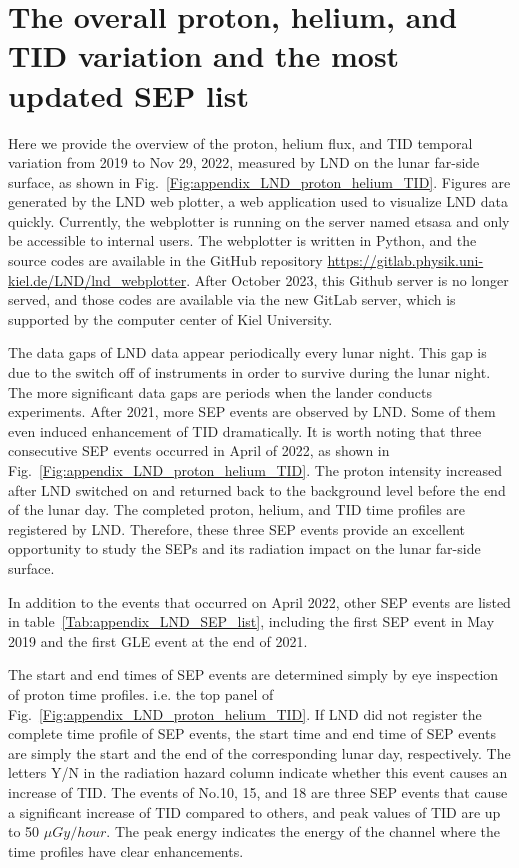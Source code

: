 \section*{The overall proton, helium, and TID variation and the most updated SEP list}


Here we provide the overview of the proton, helium flux, and \ac{TID} temporal variation from 2019 to Nov 29, 2022, measured by \ac{LND} on the lunar far-side surface, as shown in Fig.~\ref{Fig:appendix_LND_proton_helium_TID}.
Figures are generated by the \ac{LND} web plotter, a web application used to visualize \ac{LND} data quickly. 
Currently, the webplotter is running on the server named etsasa and only be accessible to internal users.
The webplotter is written in Python, and the source codes are available in the GitHub repository \url{https://gitlab.physik.uni-kiel.de/LND/lnd_webplotter}. After October 2023, this Github server is no longer served, and those codes are available via the new GitLab server, which is supported by the computer center of Kiel University.

The data gaps of \ac{LND} data appear periodically every lunar night. This gap is due to the switch off of instruments in order to survive during the lunar night. The more significant data gaps are periods when the lander conducts experiments. After 2021, more \ac{SEP} events are observed by \ac{LND}. Some of them even induced enhancement of \ac{TID} dramatically. 
It is worth noting that three consecutive \ac{SEP} events occurred in April of 2022, as shown in Fig.~\ref{Fig:appendix_LND_proton_helium_TID}. The proton intensity increased after \ac{LND} switched on and returned back to the background level before the end of the lunar day. The completed proton, helium, and \ac{TID} time profiles are registered by \ac{LND}. Therefore, these three \ac{SEP} events provide an excellent opportunity to study the \acp{SEP} and its radiation impact on the lunar far-side surface.

In addition to the events that occurred on April 2022, other \ac{SEP} events are listed in table~\ref{Tab:appendix_LND_SEP_list}, including the first \ac{SEP} event in May 2019 and the first \ac{GLE} event at the end of 2021.

The start and end times of \ac{SEP} events are determined simply by eye inspection of proton time profiles. i.e. the top panel of Fig.~\ref{Fig:appendix_LND_proton_helium_TID}. If \ac{LND} did not register the complete time profile of \ac{SEP} events, the start time and end time of \ac{SEP} events are simply the start and the end of the corresponding lunar day, respectively.
The letters Y/N in the radiation hazard column indicate whether this event causes an increase of \ac{TID}. The events of No.10, 15, and 18 are three \ac{SEP} events that cause a significant increase of \ac{TID} compared to others, and peak values of \ac{TID} are up to 50 $\mu Gy/hour$. The peak energy indicates the energy of the channel where the time profiles have clear enhancements.

